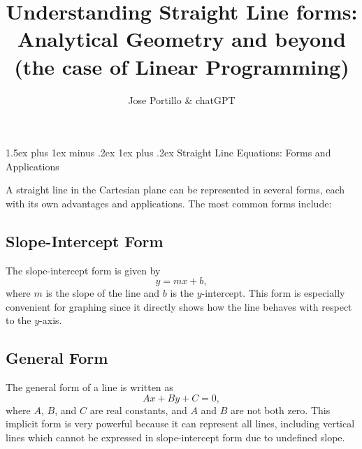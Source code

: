 \documentclass[10pt,twocolumn]{article}
\title{Understanding Straight Line forms: Analytical Geometry and beyond (the case of Linear Programming)}
\author{Jose Portillo \& chatGPT}
\date{}
\makeatletter
\renewcommand\section{%
  \@startsection{section}{1}{0pt}%
  {1.5ex plus 1ex minus .2ex}%
  {1ex plus .2ex}%
  {\normalfont\normalsize\bfseries}} %
\renewcommand\section{%
  \@startsection{section}{1}{0pt}%
  {1.5ex plus 1ex minus .2ex}%
  {1ex plus .2ex}%
  {\normalfont\Large\bfseries}} %
\makeatother
\begin{document}

\section{Straight Line Equations: Forms and Applications}

A straight line in the Cartesian plane can be represented in several forms, each with its own advantages and applications. The most common forms include:

\subsection{Slope-Intercept Form}

The slope-intercept form is given by
\begin{equation}
y = mx + b,
\end{equation}
where \(m\) is the slope of the line and \(b\) is the \(y\)-intercept. This form is especially convenient for graphing since it directly shows how the line behaves with respect to the \(y\)-axis.

\subsection{General Form}

The general form of a line is written as
\begin{equation}
Ax + By + C = 0,
\end{equation}
where \(A\), \(B\), and \(C\) are real constants, and \(A\) and \(B\) are not both zero. This implicit form is very powerful because it can represent all lines, including vertical lines which cannot be expressed in slope-intercept form due to undefined slope.
\end{document}
